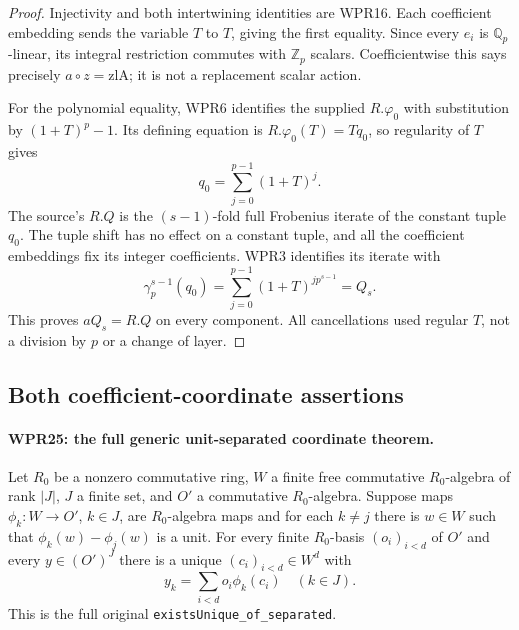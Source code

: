 \documentclass[11pt,a4paper]{article}
\numberwithin{equation}{section}
\theoremstyle{remark}\newtheorem{remark}[theorem]{Remark}
\begin{document}
\begin{proof}
Injectivity and both intertwining identities are WPR16.
Each coefficient embedding sends the variable $T$ to $T$,
giving the first equality. Since every $e_i$ is
$\mathbb Q_p$-linear, its integral restriction commutes with
$\mathbb Z_p$ scalars. Coefficientwise this says precisely
$a\circ z=\mathrm{zlA}$; it is not a replacement scalar action.

For the polynomial equality, WPR6 identifies the supplied
$R.\varphi_0$ with substitution by $(1+T)^p-1$. Its defining
equation is $R.\varphi_0(T)=Tq_0$, so regularity of $T$ gives
\[
                     q_0=\sum_{j=0}^{p-1}(1+T)^j.
\]
The source's $R.Q$ is the $(s-1)$-fold full Frobenius iterate
of the constant tuple $q_0$. The tuple shift has no effect on
a constant tuple, and all the coefficient embeddings fix its
integer coefficients. WPR3 identifies its iterate with
\[
 \gamma_p^{s-1}(q_0)
   =\sum_{j=0}^{p-1}(1+T)^{j p^{s-1}}=Q_s.
\]
This proves $aQ_s=R.Q$ on every component. All cancellations
used regular $T$, not a division by $p$ or a change of layer.
\end{proof}

\subsection{Both coefficient-coordinate assertions}

\paragraph{WPR25: the full generic unit-separated coordinate theorem.}
\label{claim:WPR25}
Let $R_0$ be a nonzero commutative ring, $W$ a finite free
commutative $R_0$-algebra of rank $|J|$, $J$ a finite set,
and $O'$ a commutative $R_0$-algebra. Suppose maps
$\phi_k:W\to O'$, $k\in J$, are $R_0$-algebra maps and
for each $k\ne j$ there is $w\in W$ such that
$\phi_k(w)-\phi_j(w)$ is a unit. For every finite
$R_0$-basis $(o_i)_{i<d}$ of $O'$ and every $y\in(O')^J$
there is a unique $(c_i)_{i<d}\in W^d$ with
\[
                    y_k=\sum_{i<d}o_i\phi_k(c_i)
                    \quad(k\in J).                         \tag{WPR.30}
\]
This is the full original \texttt{exists\allowbreak Unique\_\allowbreak of\_\allowbreak separated}.
\end{document}
